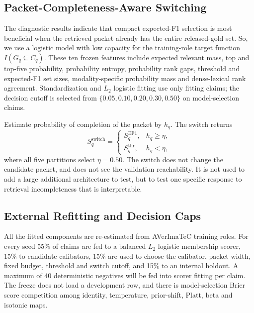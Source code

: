 \subsection{Packet-Completeness-Aware Switching}

The diagnostic results indicate that compact expected-F1 selection is most beneficial when the retrieved packet already has the entire released-gold set. So, we use a logistic model with low capacity for the training-role target function $I(G_q \subseteq C_q)$. These ten frozen features include expected relevant mass, top and top-five probability, probability entropy, probability rank gaps, threshold and expected-F1 set sizes, modality-specific probability mass and dense-lexical rank agreement. Standardization and $L_2$ logistic fitting use only fitting claims; the decision cutoff is selected from $\{0.05,0.10,0.20,0.30,0.50\}$ on model-selection claims.

Estimate probability of completion of the packet by $h_q$. The switch returns
\begin{equation}
S_q^{\mathrm{switch}}=
\begin{cases}
S_q^{\mathrm{EF1}}, & h_q\geq\eta,\\
S_q^{\mathrm{thr}}, & h_q<\eta,
\end{cases}
\label{eq:completeness-switch}
\end{equation}
where all five partitions select $\eta=0.50$. The switch does not change the candidate packet, and does not see the validation reachability. It is not used to add a large additional architecture to test, but to test one specific response to retrieval incompleteness that is interpretable.

\subsection{External Refitting and Decision Caps}

All the fitted components are re-estimated from AVerImaTeC training roles. For every seed 55\% of claims are fed to a balanced $L_2$ logistic membership scorer, 15\% to candidate calibators, 15\% are used to choose the calibator, packet width, fixed budget, threshold and switch cutoff, and 15\% to an internal holdout. A maximum of 40 deterministic negatives will be fed into scorer fitting per claim. The freeze does not load a development row, and there is model-selection Brier score competition among identity, temperature, prior-shift, Platt, beta and isotonic maps.


